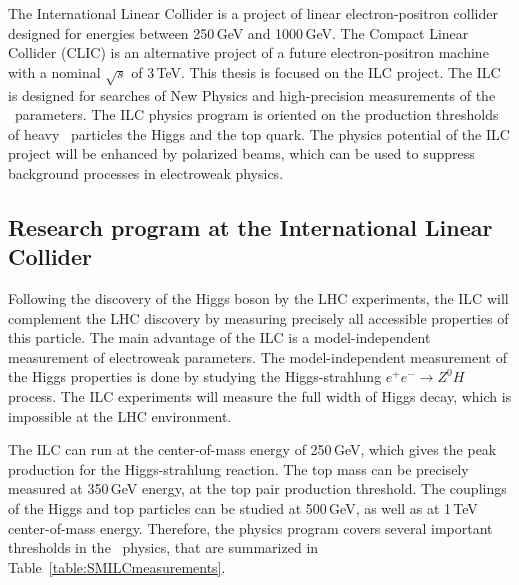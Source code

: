 The International Linear Collider is a project of linear electron-positron collider designed for energies between 250\,GeV and 1000\,GeV. 
The Compact Linear Collider (CLIC) is an alternative project of a future electron-positron machine with a nominal $\sqrt s$ of 3\,TeV. 
This thesis is focused on the ILC project.
The ILC is designed for searches of New Physics and high-precision measurements of the \sm\  parameters. 
The ILC physics program is oriented on the production thresholds of heavy \sm\ particles the Higgs and the top quark. 
The physics potential of the ILC project will be enhanced by polarized beams, which can be used to suppress background processes in electroweak physics. 




\subsection{Research program at the International Linear Collider}

Following the discovery of the Higgs boson by the LHC experiments, the ILC will complement the LHC discovery by measuring precisely all accessible properties of this particle.
The main advantage of the ILC is a model-independent measurement of electroweak parameters.
The model-independent measurement of the Higgs properties is done by studying the Higgs-strahlung $e^+e^-\to Z^0H$ process.
The ILC experiments will measure the full width of Higgs decay, which is impossible at the LHC environment. 


The ILC can run at the center-of-mass energy of 250\,GeV, which gives the peak production for the  Higgs-strahlung reaction. 
The top mass can be precisely measured at 350\,GeV energy, at the top pair production threshold. 
The couplings of the Higgs and top particles can be studied at 500\,GeV, as well as at 1\,TeV center-of-mass energy.
Therefore, the physics program covers several important thresholds in the \sm\ physics, that are summarized in Table~\ref{table:SMILCmeasurements}. 

